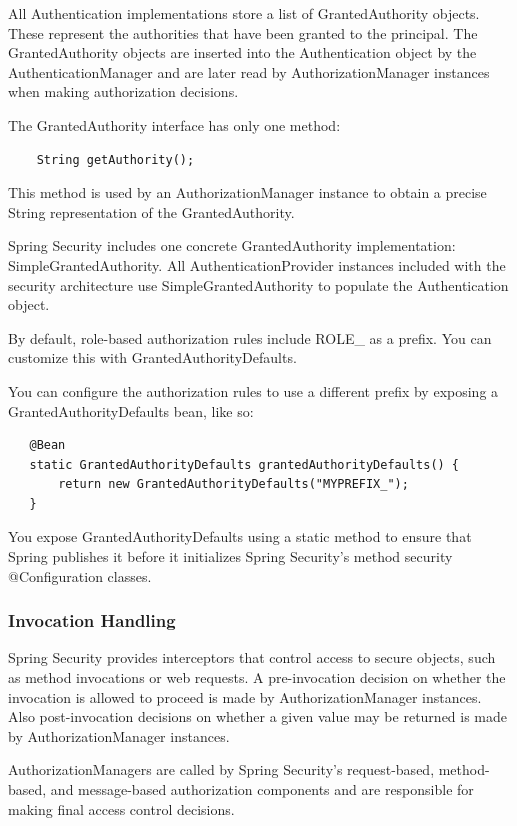 \documentclass{scrartcl}
\begin{document}
All Authentication implementations store a list of GrantedAuthority objects. These represent the authorities that have been granted to the principal. The GrantedAuthority objects are inserted into the Authentication object by the AuthenticationManager and are later read by AuthorizationManager instances when making authorization decisions.

The GrantedAuthority interface has only one method:

\begin{lstlisting}
    String getAuthority();
\end{lstlisting}

This method is used by an AuthorizationManager instance to obtain a precise String representation of the GrantedAuthority.

Spring Security includes one concrete GrantedAuthority implementation: SimpleGrantedAuthority. All AuthenticationProvider instances included with the security architecture use SimpleGrantedAuthority to populate the Authentication object.

By default, role-based authorization rules include ROLE\_ as a prefix. You can customize this with GrantedAuthorityDefaults.

You can configure the authorization rules to use a different prefix by exposing a GrantedAuthorityDefaults bean, like so:

\begin{lstlisting}
   @Bean
   static GrantedAuthorityDefaults grantedAuthorityDefaults() {
       return new GrantedAuthorityDefaults("MYPREFIX_");
   }
\end{lstlisting}

You expose GrantedAuthorityDefaults using a static method to ensure that Spring publishes it before it initializes Spring Security’s method security @Configuration classes.

\subsubsection{Invocation Handling}

Spring Security provides interceptors that control access to secure objects, such as method invocations or web requests. A pre-invocation decision on whether the invocation is allowed to proceed is made by AuthorizationManager instances. Also post-invocation decisions on whether a given value may be returned is made by AuthorizationManager instances.

AuthorizationManagers are called by Spring Security’s request-based, method-based, and message-based authorization components and are responsible for making final access control decisions.
\end{document}
